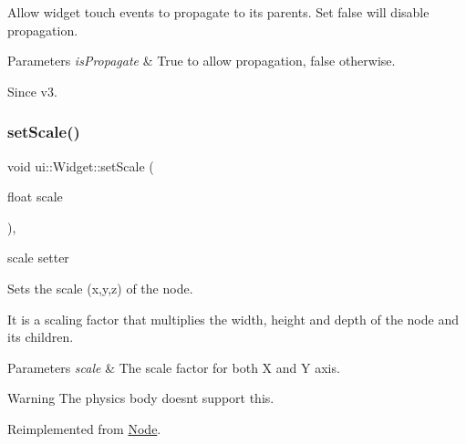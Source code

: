 Allow widget touch events to propagate to its parents. Set false will disable propagation. 


\begin{DoxyParams}{Parameters}
{\em is\+Propagate} & True to allow propagation, false otherwise. \\
\hline
\end{DoxyParams}
\begin{DoxySince}{Since}
v3. 
\end{DoxySince}
\mbox{\label{classui_1_1Widget_a811bffaa1d3bae377c00a15edccb396f}} 
\subsubsection{\texorpdfstring{set\+Scale()}{setScale()}\hspace{0.1cm}{\footnotesize\ttfamily [1/4]}}
{\footnotesize\ttfamily void ui\+::\+Widget\+::set\+Scale (\begin{DoxyParamCaption}\item[{float}]{scale }\end{DoxyParamCaption})\hspace{0.3cm}{\ttfamily [override]}, {\ttfamily [virtual]}}



scale setter 

Sets the scale (x,y,z) of the node.

It is a scaling factor that multiplies the width, height and depth of the node and its children.


\begin{DoxyParams}{Parameters}
{\em scale} & The scale factor for both X and Y axis.\\
\hline
\end{DoxyParams}
\begin{DoxyWarning}{Warning}
The physics body doesn\textquotesingle{}t support this. 
\end{DoxyWarning}


Reimplemented from \hyperlink{classNode_acf0955a52f51a9d6c8b0c9267b1e8668}{Node}.

\mbox{\label{classui_1_1Widget_aa614e1883fa58c0c7fefaa71d9055fd5}} 
